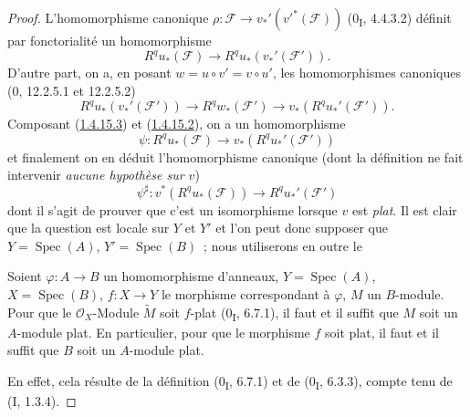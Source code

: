 \begin{proof}
L'homomorphisme canonique
$\rho:\mathcal F\to v_*'(v'^*(\mathcal F))$ (0\textsubscript{I}, 4.4.3.2)
définit par fonctorialité un homomorphisme
\begin{equation}
\label{III.1.4.15.2-fr}
\tag{1.4.15.2}
R^qu_*(\mathcal F)\longrightarrow R^qu_*(v_*'(\mathcal F')).
\end{equation}
D'autre part, on a, en posant $w=u\circ v'=v\circ u'$, les homomorphismes
canoniques (0, 12.2.5.1 et 12.2.5.2)
\begin{equation}
\label{III.1.4.15.3-fr}
\tag{1.4.15.3}
R^qu_*(v_*'(\mathcal F'))\longrightarrow R^qw_*(\mathcal F')
\longrightarrow v_*(R^qu_*'(\mathcal F')).
\end{equation}
Composant (\hyperref[III.1.4.15.3-fr]{1.4.15.3}) et
(\hyperref[III.1.4.15.2-fr]{1.4.15.2}), on a un homomorphisme
\[
\psi:R^qu_*(\mathcal F)\longrightarrow v_*(R^qu_*'(\mathcal F'))
\]
et finalement on en déduit l'homomorphisme canonique (dont la définition ne
fait intervenir \emph{aucune hypothèse sur $v$})
\begin{equation}
\label{III.1.4.15.4-fr}
\tag{1.4.15.4}
\psi^\sharp:v^*(R^qu_*(\mathcal F))\longrightarrow R^qu_*'(\mathcal F')
\end{equation}
dont il s'agit de prouver que c'est un isomorphisme lorsque $v$ est
\emph{plat}. Il est clair que la question est locale sur $Y$ et $Y'$ et l'on
peut donc supposer que $Y=\operatorname{Spec}(A)$,
$Y'=\operatorname{Spec}(B)$~; nous utiliserons en outre le

\begin{lemma}[1.4.15.5]
\label{III.1.4.15.5-fr}
Soient $\varphi:A\to B$ un homomorphisme d'anneaux,
$Y=\operatorname{Spec}(A)$, $X=\operatorname{Spec}(B)$,
$f:X\to Y$ le morphisme correspondant à $\varphi$, $M$ un $B$-module. Pour
que le $\mathcal O_X$-Module $\widetilde M$ soit $f$-plat
(0\textsubscript{I}, 6.7.1), il faut et il suffit que $M$ soit un $A$-module
plat. En particulier, pour que le morphisme $f$ soit plat, il faut et il
suffit que $B$ soit un $A$-module plat.
\end{lemma}

En effet, cela résulte de la définition (0\textsubscript{I}, 6.7.1) et de
(0\textsubscript{I}, 6.3.3), compte tenu de (I, 1.3.4).


\end{proof}
